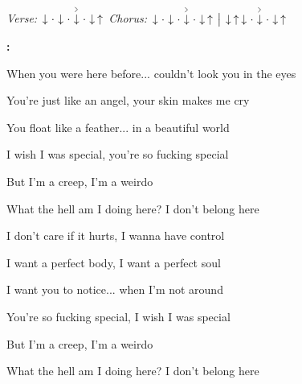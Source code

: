 \begin{song}


\begin{headerbox}
\RaiseBoxWithAccents
{} \quad
\textit{Verse:} $\Down\Miss\Down\Miss\AccentDown\Miss\Down\Up$ \quad
\textit{Chorus:} $\Down\Miss\Down\Miss\AccentDown\Miss\Down\Up \Separator \Down\Up\Down\Miss\AccentDown\Miss\Down\Up$
\end{headerbox}

\begin{hchordbox}
\end{hchordbox}

\Large

\bigskip

\Intro\textbf{:}     \par

\bigskip

When you were here before... couldn't look you in the eyes \par
You're just like an angel, your skin makes me cry \par
You float like a feather... in a beautiful world \par
I wish I was special, you're so fucking special \par

\bigskip

But I'm a creep, I'm a weirdo \par
What the hell am I doing here? I don't belong here \par

\bigskip

I don't care if it hurts, I wanna have control \par
I want a perfect body, I want a perfect soul \par
I want you to notice... when I'm not around \par
You're so fucking special, I wish I was special \par

\bigskip

But I'm a creep, I'm a weirdo \par
What the hell am I doing here? I don't belong here \par


\end{song}
